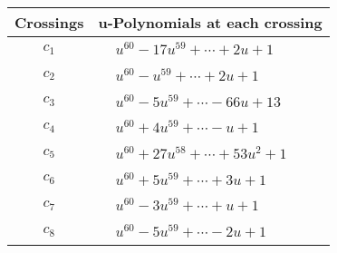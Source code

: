 \documentclass[1p]{elsarticle_modified}
\theoremstyle{definition}
\begin{document}
\begin{tabular}{m{50pt}|m{274pt}}
Crossings & \hspace{64pt}u-Polynomials at each crossing \\
\hline $$\begin{aligned}c_{1}\end{aligned}$$&$\begin{aligned}
&u^{60}-17 u^{59}+\cdots+2 u+1
\end{aligned}$\\
\hline $$\begin{aligned}c_{2}\end{aligned}$$&$\begin{aligned}
&u^{60}- u^{59}+\cdots+2 u+1
\end{aligned}$\\
\hline $$\begin{aligned}c_{3}\end{aligned}$$&$\begin{aligned}
&u^{60}-5 u^{59}+\cdots-66 u+13
\end{aligned}$\\
\hline $$\begin{aligned}c_{4}\end{aligned}$$&$\begin{aligned}
&u^{60}+4 u^{59}+\cdots- u+1
\end{aligned}$\\
\hline $$\begin{aligned}c_{5}\end{aligned}$$&$\begin{aligned}
&u^{60}+27 u^{58}+\cdots+53 u^2+1
\end{aligned}$\\
\hline $$\begin{aligned}c_{6}\end{aligned}$$&$\begin{aligned}
&u^{60}+5 u^{59}+\cdots+3 u+1
\end{aligned}$\\
\hline $$\begin{aligned}c_{7}\end{aligned}$$&$\begin{aligned}
&u^{60}-3 u^{59}+\cdots+u+1
\end{aligned}$\\
\hline $$\begin{aligned}c_{8}\end{aligned}$$&$\begin{aligned}
&u^{60}-5 u^{59}+\cdots-2 u+1
\end{aligned}$\\

\end{tabular}
\end{document}
